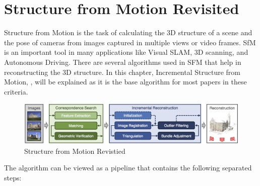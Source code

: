 \documentclass[11pt]{article}
\begin{document}
    \section{Structure from Motion Revisited}
    Structure from Motion is the task of calculating the 3D structure of a scene and the pose of cameras from
    images captured in multiple views or video frames. SfM is an important tool in many applications like
    Visual SLAM, 3D scanning, and Autonomous Driving. There are several algorithms used in SFM that help
    in reconstructing the 3D structure. In this chapter, Incremental Structure from Motion, \cite{7780814}, will be explained
    as it is the base algorithm for most papers in these criteria.

    \begin{figure}
    \caption{Structure from Motion Revistied}
    \centering
    \includegraphics[width=\textwidth,height=\textheight,keepaspectratio]{images/sfm.png}
    \end{figure}

    The algorithm can be viewed as a pipeline that contains the following separated steps:
\end{document}
